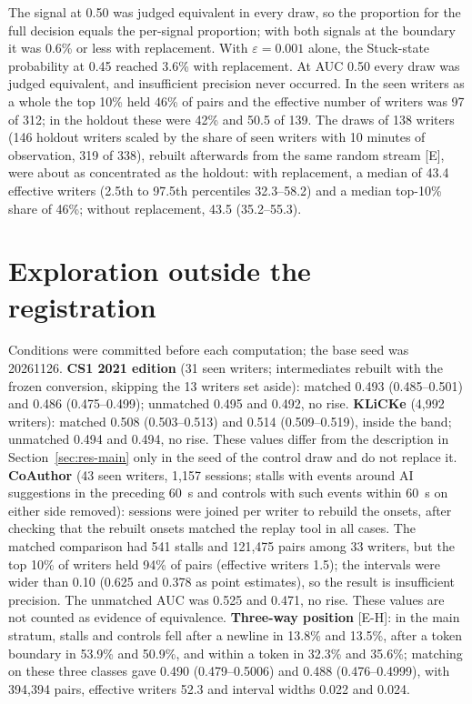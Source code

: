 The signal at 0.50 was judged equivalent in every draw, so the proportion for the full decision equals the per-signal
proportion; with both signals at the boundary it was 0.6\% or less with replacement. With $\varepsilon = 0.001$ alone,
the Stuck-state probability at 0.45 reached 3.6\% with replacement. At AUC 0.50 every draw was judged equivalent, and
insufficient precision never occurred. In the seen writers as a whole the top 10\% held 46\% of pairs and the effective number of
writers was 97 of 312; in the holdout these were 42\% and 50.5 of 139. The draws of 138 writers (146 holdout writers scaled by the share of seen writers with 10 minutes of observation,
319 of 338), rebuilt afterwards from
the same random stream [E], were about as concentrated as the holdout: with replacement, a median of 43.4 effective
writers (2.5th to 97.5th percentiles 32.3--58.2) and a median top-10\% share of 46\%; without replacement, 43.5
(35.2--55.3).

\section{Exploration outside the registration}
\label{app:explore}

Conditions were committed before each computation; the base seed was 20261126. \textbf{CS1 2021 edition} (31 seen
writers; intermediates rebuilt with the frozen conversion, skipping the 13 writers set aside): matched 0.493
(0.485--0.501) and 0.486 (0.475--0.499); unmatched 0.495 and 0.492, no rise. \textbf{KLiCKe} (4,992 writers): matched
0.508 (0.503--0.513) and 0.514 (0.509--0.519), inside the band; unmatched 0.494 and 0.494, no rise. These values differ
from the description in Section~\ref{sec:res-main} only in the seed of the control draw and do not replace it.
\textbf{CoAuthor} (43 seen writers, 1,157 sessions; stalls with events around AI suggestions in the preceding 60~s and
controls with such events within 60~s on either side removed): sessions were joined per writer to rebuild the onsets,
after checking that the rebuilt onsets matched the replay tool in all cases. The matched comparison had 541 stalls and
121,475 pairs among 33 writers, but the top 10\% of writers held 94\% of pairs (effective writers 1.5); the intervals were
wider than 0.10 (0.625 and 0.378 as point estimates), so the result is insufficient precision. The unmatched AUC was
0.525 and 0.471, no rise. These values are not counted as evidence of equivalence. \textbf{Three-way position} [E-H]:
in the main stratum, stalls and controls fell after a newline in 13.8\% and 13.5\%, after a token boundary in 53.9\% and
50.9\%, and within a token in 32.3\% and 35.6\%; matching on these three classes gave 0.490 (0.479--0.5006) and 0.488
(0.476--0.4999), with 394,394 pairs, effective writers 52.3 and interval widths 0.022 and 0.024.

